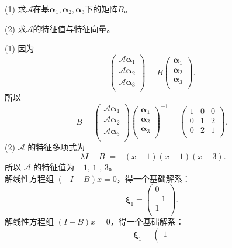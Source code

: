 \begin{enumerate}[1~]
(1) 求$\mathscr{A}$在基$\boldsymbol{\alpha}_1, \boldsymbol{\alpha}_2, \boldsymbol{\alpha}_3$下的矩阵$B$。

(2) 求$\mathscr{A}$的特征值与特征向量。

\begin{solution}
(1) 因为\[
\left( \begin{array}{c}
	\mathscr{A}\boldsymbol{\alpha} _1\\
	\mathscr{A}\boldsymbol{\alpha} _2\\
	\mathscr{A}\boldsymbol{\alpha} _3\\
\end{array} \right) =B\left( \begin{array}{c}
	\boldsymbol{\alpha} _1\\
	\boldsymbol{\alpha} _2\\
	\boldsymbol{\alpha} _3\\
\end{array} \right) .
\]
所以\[
B=\left( \begin{array}{c}
	\mathscr{A}\boldsymbol{\alpha} _1\\
	\mathscr{A}\boldsymbol{\alpha} _2\\
	\mathscr{A}\boldsymbol{\alpha} _3\\
\end{array} \right) \left( \begin{array}{c}
	\boldsymbol{\alpha} _1\\
	\boldsymbol{\alpha} _2\\
	\boldsymbol{\alpha} _3\\
\end{array} \right) ^{-1}=\left(
\begin{array}{ccc}
 1 & 0 & 0 \\
 0 & 1 & 2 \\
 0 & 2 & 1 \\
\end{array}
\right).
\]
(2) $\mathscr{A}$ 的特征多项式为\[
|\lambda I-B|=-(x+1) (x-1) (x-3).
\]
所以 $\mathscr{A}$ 的特征值为 $-1$, $1$ , $3$。\\
解线性方程组 $(-I-B)x=0$，得一个基础解系：\[
\boldsymbol{\xi}_1=\left( \begin{array}{c}
	0\\
	-1\\
	1\\
\end{array} \right) .
\]
解线性方程组 $(I-B)x=0$，得一个基础解系：\[
\boldsymbol{\xi}_1=\left( \begin{array}{c}
	1\\

\end{array}\]
\end{solution}
\end{enumerate}
